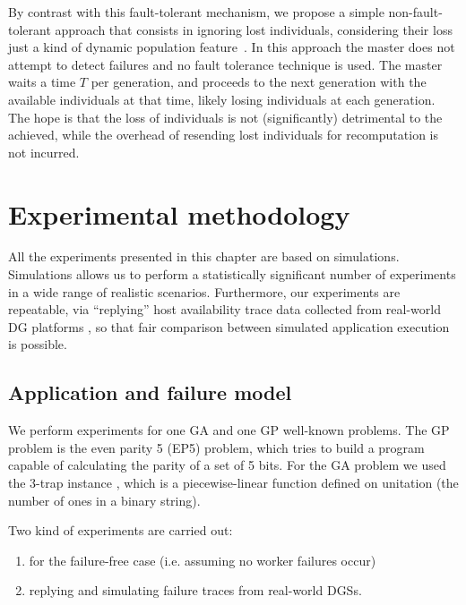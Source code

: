 \documentclass[graybox]{sty/svmult}
\begin{document}
By contrast with this fault-tolerant mechanism, we
propose a simple non-fault-tolerant approach that consists in ignoring lost
individuals, considering their loss just a kind of dynamic population
feature~\cite{dynamic-population-gp,plague,luke:2003:gecco,dynamic-population-variation-gp}.
In this approach the master does not attempt to detect failures and
no fault tolerance technique is used. The master waits a time $T$ per
generation, and proceeds to the next generation with the available individuals at that time,
likely losing individuals at each generation. The hope is that the
loss of individuals is not (significantly) detrimental to the achieved,
while the overhead of resending
lost individuals for recomputation is not incurred.

\section{Experimental methodology}
\label{experiments-setup}

All the experiments presented in this chapter are based on simulations. Simulations allows us to perform a statistically
significant number of experiments in a wide range of realistic scenarios. Furthermore, our experiments are repeatable, via
``replying'' host availability trace data collected from real-world DG platforms \cite{traces-dgc}, so that fair comparison
between simulated application execution is possible.

\subsection{Application and failure model}

We perform experiments for one GA and one GP well-known problems. The GP problem is the even parity 5 (EP5) problem, which
tries to build a program capable of calculating the parity of a set of 5 bits. For the GA problem we used the 3-trap instance
\cite{ackley:trap}, which is a piecewise-linear function defined on unitation (the number of ones in a binary string).

Two kind of experiments are carried out:
\begin{enumerate}
    \item for the failure-free case (i.e. assuming no worker failures occur)
    \item replying and simulating failure traces from real-world DGSs.
\end{enumerate}
\end{document}
